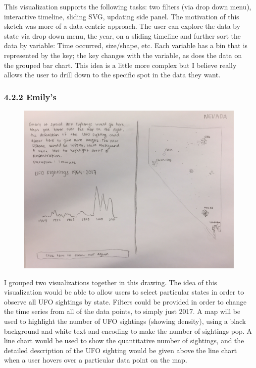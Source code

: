 \documentclass{neu_handout}
\begin{document}
This visualization supports the following tasks: two filters (via drop down menu), interactive timeline, sliding SVG, updating ​side panel. The motivation of this sketch was more of a data-centric approach. The user can explore the data by state via drop down menu, the year, on a sliding timeline and further sort the data by variable: Time occurred, size/shape, etc. Each variable has a bin that is represented by the key; the key changes with the variable, as does the data on the grouped bar chart. This idea is a little more complex but I believe really allows the user to drill down to the specific spot in the data they want.

\newpage

\subsubsection*{4.2.2 Emily's}

\begin{figure}[h]
\centering
{
\includegraphics[width=0.9\linewidth]{emily1}
}
\end{figure}

I grouped two visualizations together in this drawing. The idea of this visualization would be able to allow users to select particular states in order to observe all UFO sightings by state. Filters could be provided in order to change the time series from all of the data points, to simply just 2017. A map will be used to highlight the number of UFO sightings (showing density), using a black background and white text and encoding to make the number of sightings pop. A line chart would be used to show the quantitative number of sightings, and the detailed description of the UFO sighting would be given above the line chart when a user hovers over a particular data point on the map.\\\\
\end{document}
